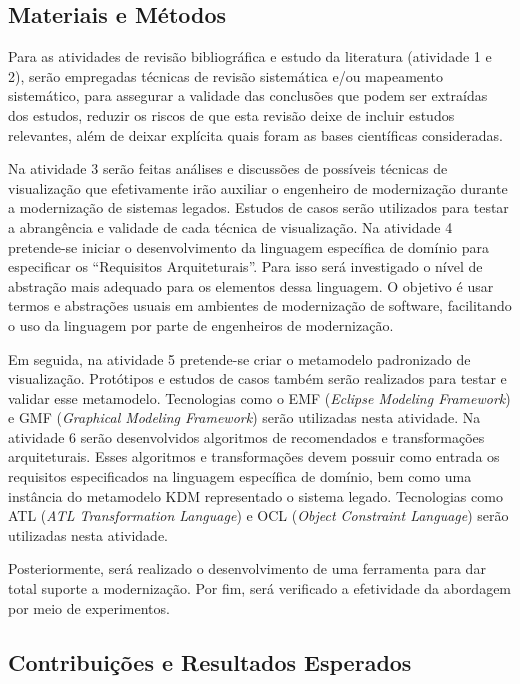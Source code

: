 \documentclass[12pt]{article}
\begin{document}
\subsection{Materiais e Métodos}

Para as atividades de revisão bibliográfica e estudo da literatura (atividade 1 e 2), serão empregadas técnicas de revisão sistemática e/ou mapeamento sistemático, para assegurar a validade das conclusões que podem ser extraídas dos estudos, reduzir os riscos de que esta revisão deixe de incluir estudos relevantes, além de deixar explícita quais foram as bases científicas consideradas.

Na atividade 3 serão feitas análises e discussões de possíveis técnicas de visualização que efetivamente irão auxiliar o engenheiro de modernização durante a modernização de sistemas legados. Estudos de casos serão utilizados para testar a abrangência e validade de cada técnica de visualização. Na atividade 4 pretende-se iniciar o desenvolvimento da linguagem específica de domínio para especificar os ``Requisitos Arquiteturais''. Para isso será investigado o nível de abstração mais adequado para os elementos dessa linguagem. O objetivo é usar termos e abstrações usuais em ambientes de modernização de software, facilitando o uso da linguagem por parte de engenheiros de modernização.

Em seguida, na atividade 5 pretende-se criar o metamodelo padronizado de visualização. Protótipos e estudos de casos também serão realizados para testar e validar esse metamodelo. Tecnologias como o EMF (\textit{Eclipse Modeling Framework}) e GMF (\textit{Graphical Modeling Framework}) serão utilizadas nesta atividade. Na atividade 6 serão desenvolvidos algoritmos de recomendados e transformações arquiteturais. Esses algoritmos e transformações devem possuir como entrada os requisitos especificados na linguagem específica de domínio, bem como uma instância do metamodelo KDM representado o sistema legado. Tecnologias como ATL (\textit{ATL Transformation Language}) e OCL (\textit{Object Constraint Language}) serão utilizadas nesta atividade. 

Posteriormente, será realizado o desenvolvimento de uma ferramenta para dar total suporte a modernização. Por fim, será verificado a efetividade da abordagem por meio de experimentos. 

\subsection{Contribuições e Resultados Esperados}\label{sec:resultados_esperados}
\end{document}
